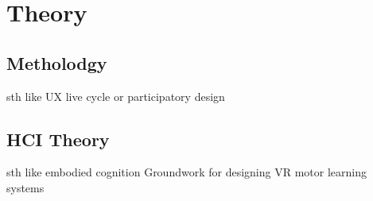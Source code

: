 \chapter{Theory}
\section{Metholodgy}
sth like UX live cycle or participatory design
\section{HCI Theory}
sth like embodied cognition
Groundwork for designing VR motor learning systems

